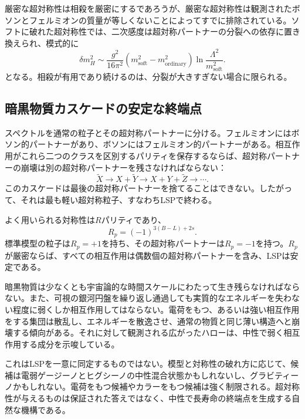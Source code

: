 厳密な超対称性は相殺を厳密にするであろうが、厳密な超対称性は観測されたボソンとフェルミオンの質量が等しくないことによってすでに排除されている。ソフトに破れた超対称性では、二次感度は超対称パートナーの分裂への依存に置き換えられ、模式的に
\begin{equation}
\delta m_H^2
\sim
\frac{g^2}{16\pi^2}
\left(m_{\mathrm{soft}}^2-m_{\mathrm{ordinary}}^2\right)
\ln\frac{\Lambda^2}{m_{\mathrm{soft}}^2}.
\end{equation}
となる。相殺が有用であり続けるのは、分裂が大きすぎない場合に限られる。

\subsection{暗黒物質カスケードの安定な終端点}

スペクトルを通常の粒子とその超対称パートナーに分ける。フェルミオンにはボソン的パートナーがあり、ボソンにはフェルミオン的パートナーがある。相互作用がこれら二つのクラスを区別するパリティを保存するならば、超対称パートナーの崩壊は別の超対称パートナーを残さなければならない：
\begin{equation}
\widetilde X
\longrightarrow X+\widetilde Y
\longrightarrow X+Y+\widetilde Z
\longrightarrow\cdots.
\end{equation}
このカスケードは最後の超対称パートナーを捨てることはできない。したがって、それは最も軽い超対称粒子、すなわちLSPで終わる。

よく用いられる対称性は\(R\)パリティであり、
\begin{equation}
R_p=(-1)^{3(B-L)+2s}.
\end{equation}
標準模型の粒子は\(R_p=+1\)を持ち、その超対称パートナーは\(R_p=-1\)を持つ。\(R_p\)が厳密ならば、すべての相互作用は偶数個の超対称パートナーを含み、LSPは安定である。

暗黒物質は少なくとも宇宙論的な時間スケールにわたって生き残らなければならない。また、可視の銀河円盤を繰り返し通過しても実質的なエネルギーを失わない程度に弱くしか相互作用してはならない。電荷をもつ、あるいは強い相互作用をする集団は散乱し、エネルギーを散逸させ、通常の物質と同じ薄い構造へと崩壊する傾向がある。それに対して観測される広がったハローは、中性で弱く相互作用する成分を示唆している。

これはLSPを一意に同定するものではない。模型と対称性の破れ方に応じて、候補は電弱ゲージーノとヒグシーノの中性混合状態かもしれないし、グラビティーノかもしれない。電荷をもつ候補やカラーをもつ候補は強く制限される。超対称性が与えるものは保証された答えではなく、中性で長寿命の終端点を生成する自然な機構である。

